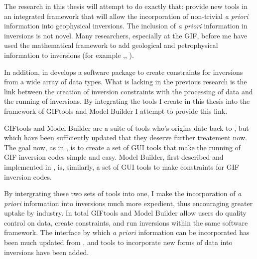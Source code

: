 The research in this thesis will attempt to do exactly that: provide new tools in an integrated framework that will allow the incorporation of non-trivial \emph{a priori} information into geophysical inversions. The inclusion of \emph{a priori} information in inversions is not novel. Many researchers, especially at the \ac{GIF}, before me have used the mathematical framework to add geological and petrophysical information to inversions (for example \citealt{Lelievre2009Integrating},\citealt{phillips2001thesis}, \citealt{farquharson2008geologically}). 

In addition, in \cite{williams2008geologically} develops a software package to create constraints for inversions from a wide array of data types. What is lacking in the previous research is the link between the creation of inversion constraints with the processing of data and the running of inversions. By integrating the tools I create in this thesis into the framework of GIFtools and Model Builder I attempt to provide this link. 

GIFtools and Model Builder are a suite of tools who's origins date back to \cite{williams2008geologically}, but which have been sufficiently updated that they deserve further treatement now. The goal now, as in \cite{williams2008geologically}, is to create a set of \ac{GUI} tools that make the running of \ac{GIF} inversion codes simple and easy. Model Builder, first described and implemented in \cite{williams2008geologically}, is, similarly, a set of \ac{GUI} tools to make constraints for \ac{GIF} inversion codes.


By intergrating these two sets of tools into one, I make the incorporation of \emph{a priori} information into inversions much more expedient, thus encouraging greater uptake by industry.  In total GIFtools and Model Builder allow users do quality control on data, create constraints, and run inversions within the same software framework. The interface by which \emph{a priori} information can be incorporated has been much updated from \cite{williams2008geologically}, and tools to incorporate new forms of data into inversions have been added. 




